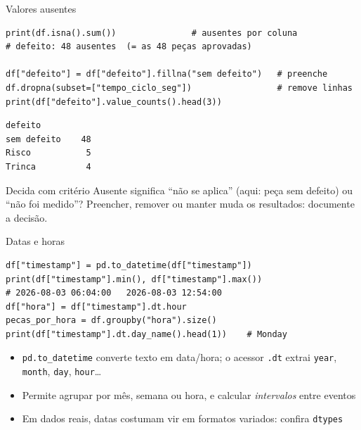 \documentclass[aspectratio=169,10pt,t]{beamer}
\begin{document}
\begin{frame}[fragile]{Valores ausentes}
\begin{lstlisting}
print(df.isna().sum())               # ausentes por coluna
# defeito: 48 ausentes  (= as 48 peças aprovadas)

df["defeito"] = df["defeito"].fillna("sem defeito")   # preenche
df.dropna(subset=["tempo_ciclo_seg"])                 # remove linhas
print(df["defeito"].value_counts().head(3))
\end{lstlisting}
\begin{lstlisting}[style=saida]
defeito
sem defeito    48
Risco           5
Trinca          4
\end{lstlisting}
  \begin{alertblock}{Decida com critério}
    Ausente significa ``não se aplica'' (aqui: peça sem defeito) ou ``não foi medido''? Preencher, remover ou manter muda os resultados: documente a decisão.
  \end{alertblock}
\end{frame}

\begin{frame}[fragile]{Datas e horas}
\begin{lstlisting}
df["timestamp"] = pd.to_datetime(df["timestamp"])
print(df["timestamp"].min(), df["timestamp"].max())
# 2026-08-03 06:04:00   2026-08-03 12:54:00
df["hora"] = df["timestamp"].dt.hour
pecas_por_hora = df.groupby("hora").size()
print(df["timestamp"].dt.day_name().head(1))    # Monday
\end{lstlisting}
  \begin{itemize}
    \item \texttt{pd.to\_datetime} converte texto em data/hora; o acessor \texttt{.dt} extrai \texttt{year}, \texttt{month}, \texttt{day}, \texttt{hour}\ldots
    \item Permite agrupar por mês, semana ou hora, e calcular \emph{intervalos} entre eventos
    \item Em dados reais, datas costumam vir em formatos variados: confira \texttt{dtypes}
  \end{itemize}
\end{frame}
\end{document}
